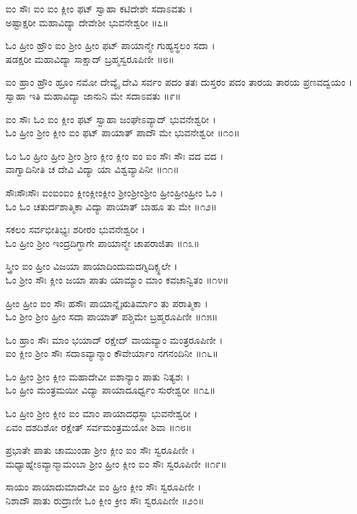 ಐಂ ಸೌಃ ಐಂ ಐಂ ಕ್ಲೀಂ ಫಟ್ ಸ್ವಾಹಾ ಕಟಿದೇಶೇ ಸದಾಽವತು ।\\
ಅಷ್ಟಾಕ್ಷರೀ ಮಹಾವಿದ್ಯಾ ದೇವೇಶೀ ಭುವನೇಶ್ವರೀ ॥೭॥

ಓಂ ಹ್ರೀಂ ಹ್ರೌಂ ಐಂ ಶ್ರೀಂ ಹ್ರೀಂ ಫಟ್ ಪಾಯಾನ್ಮೇ ಗುಹ್ಯಸ್ಥಲಂ ಸದಾ ।\\
ಷಡಕ್ಷರೀ ಮಹಾವಿದ್ಯಾ ಸಾಕ್ಷಾದ್ ಬ್ರಹ್ಮಸ್ವರೂಪಿಣೀ ॥೮॥

ಐಂ ಹ್ರಾಂ ಹ್ರೌಂ ಹ್ರೂಂ ನಮೋ ದೇವ್ಯೈ ದೇವಿ ಸರ್ವಂ ಪದಂ ತತಃ
ದುಸ್ತರಂ ಪದಂ ತಾರಯ ತಾರಯ ಪ್ರಣವದ್ವಯಂ ।\\
ಸ್ವಾಹಾ ಇತಿ ಮಹಾವಿದ್ಯಾ ಜಾನುನಿ ಮೇ ಸದಾಽವತು ॥೯॥

ಐಂ ಸೌಃ ಓಂ ಐಂ ಕ್ಲೀಂ ಫಟ್ ಸ್ವಾಹಾ ಜಂಘೇಽವ್ಯಾದ್ ಭುವನೇಶ್ವರೀ ।\\
ಓಂ ಹ್ರೀಂ ಶ್ರೀಂ ಕ್ಲೀಂ ಐಂ ಫಟ್ ಪಾಯಾತ್ ಪಾದೌ ಮೇ ಭುವನೇಶ್ವರೀ ॥೧೦॥

ಓಂ ಓಂ ಹ್ರೀಂ ಹ್ರೀಂ ಶ್ರೀಂ ಶ್ರೀಂ ಕ್ಲೀಂ ಕ್ಲೀಂ ಐಂ ಐಂ ಸೌಃ ಸೌಃ ವದ ವದ ।\\
ವಾಗ್ವಾದಿನೀತಿ ಚ ದೇವಿ ವಿದ್ಯಾ ಯಾ ವಿಶ್ವವ್ಯಾಪಿನೀ ॥೧೧॥

ಸೌಃಸೌಃಸೌಃ ಐಂಐಂಐಂ ಕ್ಲೀಂಕ್ಲೀಂಕ್ಲೀಂ ಶ್ರೀಂಶ್ರೀಂಶ್ರೀಂ ಹ್ರೀಂಹ್ರೀಂಹ್ರೀಂ ಓಂ ।\\
ಓಂ ಓಂ ಚತುರ್ದಶಾತ್ಮಿಕಾ ವಿದ್ಯಾ ಪಾಯಾತ್ ಬಾಹೂ ತು ಮೇ ॥೧೨॥

ಸಕಲಂ ಸರ್ವಭೀತಿಭ್ಯಃ ಶರೀರಂ ಭುವನೇಶ್ವರೀ ।\\
ಓಂ ಹ್ರೀಂ ಶ್ರೀಂ ಇಂದ್ರದಿಗ್ಭಾಗೇ ಪಾಯಾನ್ಮೇ ಚಾಪರಾಜಿತಾ ॥೧೩॥

ಸ್ತ್ರೀಂ ಐಂ ಹ್ರೀಂ ವಿಜಯಾ ಪಾಯಾದಿಂದುಮದಗ್ನಿದಿಕ್ಸ್ಥಲೇ ।\\
ಓಂ ಶ್ರೀಂ ಸೌಃ ಕ್ಲೀಂ ಜಯಾ ಪಾತು ಯಾಮ್ಯಾಂ ಮಾಂ ಕವಚಾನ್ವಿತಂ ॥೧೪॥

ಹ್ರೀಂ ಹ್ರೀಂ ಐಂ ಸೌಃ ಹಸೌಃ ಪಾಯಾನ್ನೈಋತಿರ್ಮಾಂ ತು ಪರಾತ್ಮಿಕಾ ।\\
ಓಂ ಶ್ರೀಂ ಶ್ರೀಂ ಹ್ರೀಂ ಸದಾ ಪಾಯಾತ್ ಪಶ್ಚಿಮೇ ಬ್ರಹ್ಮರೂಪಿಣೀ ॥೧೫॥

ಓಂ ಹ್ರಾಂ ಸೌಃ ಮಾಂ ಭಯಾದ್ ರಕ್ಷೇದ್ ವಾಯವ್ಯಾಂ ಮಂತ್ರರೂಪಿಣೀ ।\\
ಐಂ ಕ್ಲೀಂ ಶ್ರೀಂ ಸೌಃ ಸದಾಽವ್ಯಾನ್ಮಾಂ ಕೌವೇರ್ಯಾಂ ನಗನಂದಿನೀ ॥೧೬॥

ಓಂ ಹ್ರೀಂ ಶ್ರೀಂ ಕ್ಲೀಂ ಮಹಾದೇವೀ ಐಶಾನ್ಯಾಂ ಪಾತು ನಿತ್ಯಶಃ ।\\
ಓಂ ಹ್ರೀಂ ಮಂತ್ರಮಯೀ ವಿದ್ಯಾ ಪಾಯಾದೂರ್ಧ್ವಂ ಸುರೇಶ್ವರೀ ॥೧೭॥

ಓಂ ಹ್ರೀಂ ಶ್ರೀಂ ಕ್ಲೀಂ ಐಂ ಮಾಂ ಪಾಯಾದಧಸ್ಥಾ ಭುವನೇಶ್ವರೀ ।\\
ಏವಂ ದಶದಿಶೋ ರಕ್ಷೇತ್ ಸರ್ವಮಂತ್ರಮಯೋ ಶಿವಾ ॥೧೮॥

ಪ್ರಭಾತೇ ಪಾತು ಚಾಮುಂಡಾ ಶ್ರೀಂ ಕ್ಲೀಂ ಐಂ ಸೌಃ ಸ್ವರೂಪಿಣೀ ।\\
ಮಧ್ಯಾಹ್ನೇಽವ್ಯಾನ್ಮಾಮಂಬಾ ಶ್ರೀಂ ಹ್ರೀಂ ಕ್ಲೀಂ ಐಂ ಸೌಃ ಸ್ವರೂಪಿಣೀ ॥೧೯॥

ಸಾಯಂ ಪಾಯಾದುಮಾದೇವೀ ಐಂ ಹ್ರೀಂ ಕ್ಲೀಂ ಸೌಃ ಸ್ವರೂಪಿಣೀ ।\\
ನಿಶಾದೌ ಪಾತು ರುದ್ರಾಣೀ ಓಂ ಕ್ಲೀಂ ಕ್ರೀಂ ಸೌಃ ಸ್ವರೂಪಿಣೀ ॥೨೦॥

